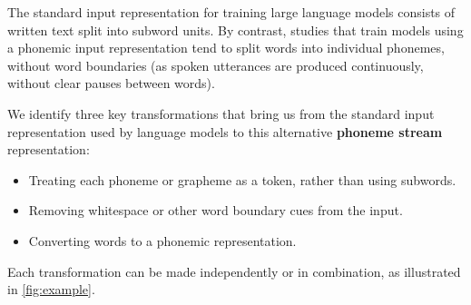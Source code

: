 The standard input representation for training large language models consists of written text split into subword units. By contrast, studies that train models using a phonemic input representation tend to split words into individual phonemes, without word boundaries (as spoken utterances are produced continuously, without clear pauses between words).

We identify three key transformations that bring us from the standard input representation used by language models to this alternative \textbf{phoneme stream} representation:


\begin{itemize}
\setlength\itemsep{0.1em}
    \item {} Treating each phoneme or grapheme as a token, rather than using subwords.
    \item {} Removing whitespace or other word boundary cues from the input.
    \item {} Converting words to a phonemic representation. 
\end{itemize}




\noindent
Each transformation can be made independently or in combination, as illustrated in \cref{fig:example}. %

